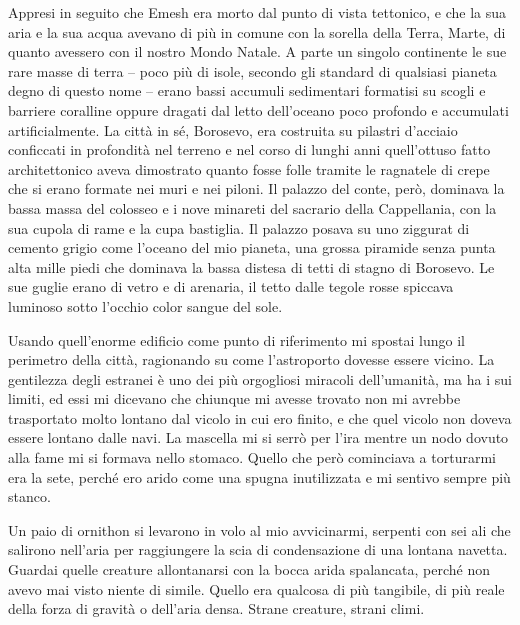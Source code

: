 Appresi in seguito che Emesh era morto dal punto di vista tettonico, e
che la sua aria e la sua acqua avevano di più in comune con la sorella
della Terra, Marte, di quanto avessero con il nostro Mondo Natale. A
parte un singolo continente le sue rare masse di terra -- poco più di
isole, secondo gli standard di qualsiasi pianeta degno di questo nome --
erano bassi accumuli sedimentari formatisi su scogli e barriere
coralline oppure dragati dal letto dell'oceano poco profondo e
accumulati artificialmente. La città in sé, Borosevo, era costruita su
pilastri d'acciaio conficcati in profondità nel terreno e nel corso di
lunghi anni quell'ottuso fatto architettonico aveva dimostrato quanto
fosse folle tramite le ragnatele di crepe che si erano formate nei muri
e nei piloni. Il palazzo del conte, però, dominava la bassa massa del
colosseo e i nove minareti del sacrario della Cappellania, con la sua
cupola di rame e la cupa bastiglia. Il palazzo posava su uno ziggurat di
cemento grigio come l'oceano del mio pianeta, una grossa piramide senza
punta alta mille piedi che dominava la bassa distesa di tetti di stagno
di Borosevo. Le sue guglie erano di vetro e di arenaria, il tetto dalle
tegole rosse spiccava luminoso sotto l'occhio color sangue del sole.

Usando quell'enorme edificio come punto di riferimento mi spostai lungo
il perimetro della città, ragionando su come l'astroporto dovesse essere
vicino. La gentilezza degli estranei è uno dei più orgogliosi miracoli
dell'umanità, ma ha i sui limiti, ed essi mi dicevano che chiunque mi
avesse trovato non mi avrebbe trasportato molto lontano dal vicolo in
cui ero finito, e che quel vicolo non doveva essere lontano dalle navi.
La mascella mi si serrò per l'ira mentre un nodo dovuto alla fame mi si
formava nello stomaco. Quello che però cominciava a torturarmi era la
sete, perché ero arido come una spugna inutilizzata e mi sentivo sempre
più stanco.

Un paio di ornithon si levarono in volo al mio avvicinarmi, serpenti con
sei ali che salirono nell'aria per raggiungere la scia di condensazione
di una lontana navetta. Guardai quelle creature {allontanarsi} con la
bocca arida spalancata, perché non avevo mai visto niente di simile.
Quello era qualcosa di più tangibile, di più reale della forza di
gravità o dell'aria densa. Strane creature, strani climi.

